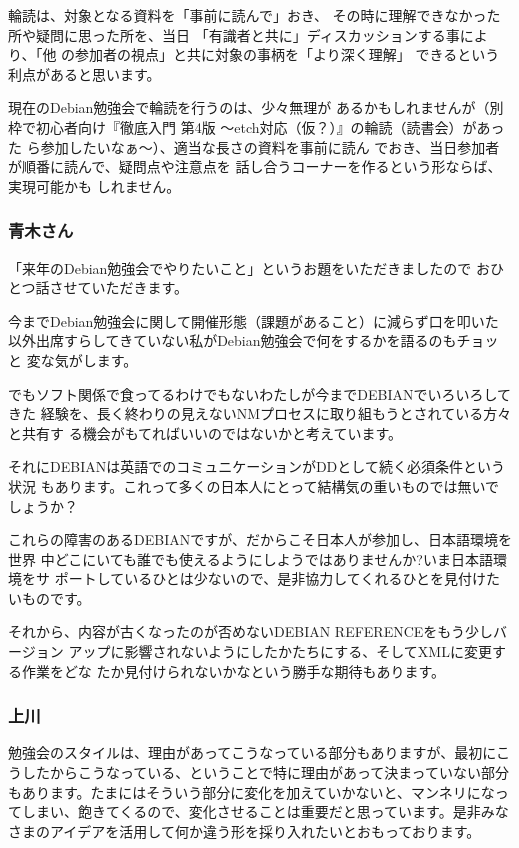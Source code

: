 \documentclass[mingoth,a4paper]{jsarticle}
\begin{document}
    輪読は、対象となる資料を「事前に読んで」おき、
その時に理解できなかった所や疑問に思った所を、当日
「有識者と共に」ディスカッションする事により、「他
の参加者の視点」と共に対象の事柄を「より深く理解」
できるという利点があると思います。

    現在のDebian勉強会で輪読を行うのは、少々無理が
あるかもしれませんが（別枠で初心者向け『徹底入門
第4版 〜etch対応（仮？）』の輪読（読書会）があった
ら参加したいなぁ〜）、適当な長さの資料を事前に読ん
でおき、当日参加者が順番に読んで、疑問点や注意点を
話し合うコーナーを作るという形ならば、実現可能かも
しれません。

\subsubsection{青木さん}

「来年のDebian勉強会でやりたいこと」というお題をいただきましたので
おひとつ話させていただきます。

今までDebian勉強会に関して開催形態（課題があること）に減らず口を叩いた
以外出席すらしてきていない私がDebian勉強会で何をするかを語るのもチョッと
変な気がします。

でもソフト関係で食ってるわけでもないわたしが今までDEBIANでいろいろしてきた
経験を、長く終わりの見えないNMプロセスに取り組もうとされている方々と共有す
る機会がもてればいいのではないかと考えています。

それにDEBIANは英語でのコミュニケーションがDDとして続く必須条件という状況
もあります。これって多くの日本人にとって結構気の重いものでは無いでしょうか？

これらの障害のあるDEBIANですが、だからこそ日本人が参加し、日本語環境を世界
中どこにいても誰でも使えるようにしようではありませんか?いま日本語環境をサ
ポートしているひとは少ないので、是非協力してくれるひとを見付けたいものです。

それから、内容が古くなったのが否めないDEBIAN REFERENCEをもう少しバージョン
アップに影響されないようにしたかたちにする、そしてXMLに変更する作業をどな
たか見付けられないかなという勝手な期待もあります。

\subsubsection{上川}

勉強会のスタイルは、理由があってこうなっている部分もありますが、最初にこ
うしたからこうなっている、ということで特に理由があって決まっていない部分
もあります。たまにはそういう部分に変化を加えていかないと、マンネリになっ
てしまい、飽きてくるので、変化させることは重要だと思っています。是非みな
さまのアイデアを活用して何か違う形を採り入れたいとおもっております。
\end{document}
